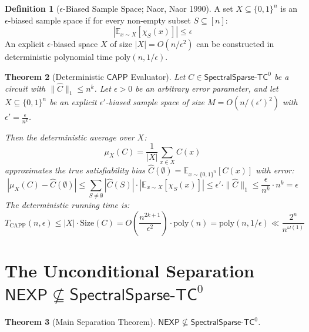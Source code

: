 \documentclass[11pt,a4paper]{article}
\newtheorem{theorem}{Theorem}[section]
\theoremstyle{definition}
\newtheorem{definition}[theorem]{Definition}
\theoremstyle{remark}
\newcommand{\NEXP}{\mathsf{NEXP}}
\newcommand{\CAPP}{\mathsf{CAPP}}
\newcommand{\SparseTC}{\mathsf{SpectralSparse}\text{-}\mathsf{TC}^0}
\begin{document}
\begin{definition}[$\epsilon$-Biased Sample Space; Naor, Naor 1990]
A set $X \subseteq \{0,1\}^n$ is an $\epsilon$-biased sample space if for every non-empty subset $S \subseteq [n]$:
\[
\left| \mathbb{E}_{x \sim X} [\chi_S(x)] \right| \le \epsilon
\]
An explicit $\epsilon$-biased space $X$ of size $|X| = O(n / \epsilon^2)$ can be constructed in deterministic polynomial time $\mathrm{poly}(n, 1/\epsilon)$.
\end{definition}

\begin{theorem}[Deterministic $\CAPP$ Evaluator]\label{thm:deterministic_capp}
Let $C \in \SparseTC$ be a circuit with $\| \hat{C} \|_1 \le n^k$. Let $\epsilon > 0$ be an arbitrary error parameter, and let $X \subseteq \{0,1\}^n$ be an explicit $\epsilon'$-biased sample space of size $M = O(n / (\epsilon')^2)$ with $\epsilon' = \frac{\epsilon}{n^k}$.

Then the deterministic average over $X$:
\[
\mu_X(C) = \frac{1}{|X|} \sum_{x \in X} C(x)
\]
approximates the true satisfiability bias $\hat{C}(\emptyset) = \mathbb{E}_{x \sim \{0,1\}^n}[C(x)]$ with error:
\[
\left| \mu_X(C) - \hat{C}(\emptyset) \right| \le \sum_{S \neq \emptyset} |\hat{C}(S)| \cdot \left| \mathbb{E}_{x \sim X}[\chi_S(x)] \right| \le \epsilon' \cdot \| \hat{C} \|_1 \le \frac{\epsilon}{n^k} \cdot n^k = \epsilon
\]
The deterministic running time is:
\[
T_{\mathrm{CAPP}}(n, \epsilon) \le |X| \cdot \mathrm{Size}(C) = O\left( \frac{n^{2k+1}}{\epsilon^2} \right) \cdot \mathrm{poly}(n) = \mathrm{poly}(n, 1/\epsilon) \ll \frac{2^n}{n^{\omega(1)}}
\]
\end{theorem}

\section{The Unconditional Separation $\NEXP \not\subseteq \SparseTC$}

\begin{theorem}[Main Separation Theorem]\label{thm:main_separation}
$\NEXP \not\subseteq \SparseTC$.
\end{theorem}
\end{document}
